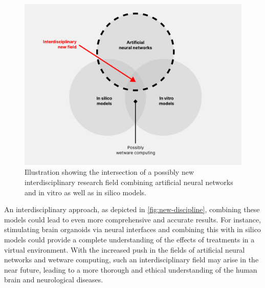 \documentclass[10pt]{article}
\begin{document}
\begin{sloppypar}
  \begin{figure}[ht]
    \centering
    \includegraphics[width=\textwidth]{figures/new-discipline.png}
    \caption[Illustration showing the intersection of a possibly new interdisciplinary research field combining artificial neural networks and in vitro as well as in silico models.]{Illustration showing the intersection of a possibly new interdisciplinary research field combining artificial neural networks and in vitro as well as in silico models.}
    \label{fig:new-discipline}
  \end{figure}

  An interdisciplinary approach, as depicted in \autoref{fig:new-discipline}, combining these models could lead to even more comprehensive and accurate results. For instance, stimulating brain organoids via neural interfaces and combining this with in silico models could provide a complete understanding of the effects of treatments in a virtual environment. With the increased push in the fields of artificial neural networks and wetware computing, such an interdisciplinary field may arise in the near future, leading to a more thorough and ethical understanding of the human brain and neurological diseases.

  \pagebreak
  \singlespacing %
  
  

\end{sloppypar}
\end{document}
